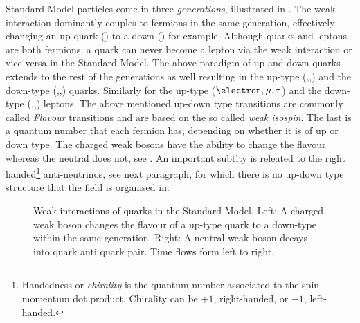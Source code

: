 Standard Model particles come in three {\it generations}, illustrated in .
The weak interaction dominantly couples to fermions in the same generation, effectively changing an up quark (\uquark) to a down (\dquark) for example.
Although quarks and leptons are both fermions, a quark can never become a lepton via the weak interaction or vice versa in the Standard Model.
The above paradigm of up and down quarks extends to the rest of the generations as well resulting in the up-type (\uquark,\cquark,\tquark)
and the down-type (\dquark,\squark,\bquark) quarks. Similarly for the  up-type ($\electron,\mu,\tau$) and the down-type (\neue,\neum,\neut)
leptons. The above mentioned up-down type transitions are commonly called {\it Flavour} transitions and are based on the so called
{\it weak isospin}. The last is a quantum number that each fermion has, depending on whether it is of up or down type.
The charged weak bosons \Wpm have the ability to change the flavour whereas the neutral \Z  does not, see .
An important subtlty is releated to the right handed\footnote{Handedness or {\it chirality} is the quantum number associated to the
spin-momentum dot product. Chirality can be $+1$, right-handed, or $-1$, left-handed. } anti-neutrinos, see next paragraph, \neub
for which there is no up-down type structure that the \neub field is organised in.

\begin{figure}[h!]
  \centering
  {\sffamily }
  \caption{Weak interactions of quarks in the Standard Model. Left: A charged weak boson changes the flavour of a up-type quark to a down-type within the same generation.
           Right: A neutral weak boson decays into quark anti quark pair. Time flows form left to right.}
  \label{WeakInteractions}
\end{figure}

